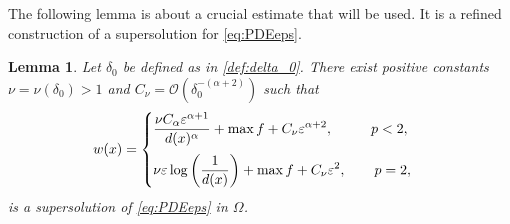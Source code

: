 \documentclass[12pt,reqno]{amsart}
\numberwithin{figure}{section}
\theoremstyle{plain}
\newtheorem{lem}[thm]{Lemma}
\theoremstyle{remark}
\numberwithin{equation}{section}
\begin{document}
\noindent The following lemma is about a crucial estimate that will be used. It is a refined construction of a supersolution for \eqref{eq:PDEeps}.
\begin{lem}\label{lem:super_refined} Let $\delta_0$ be defined as in \eqref{def:delta_0}. There exist positive constants $\nu = \nu(\delta_0)> 1$ and $C_\nu =\mathcal{O}\left(\delta_0^{-(\alpha+2)}\right)$ such that
\begin{equation}\label{e:superwa}
w(x) = \begin{cases}
    \displaystyle\frac{\nu C_\alpha \varepsilon^{\alpha+1}}{d(x)^\alpha} + \max f + C_\nu \varepsilon^{\alpha+2}, \qquad\;\;\,  p<2,\vspace{0.2cm}\\
    \displaystyle\nu \varepsilon \log\left(\frac{1}{d(x)}\right) + \max f+ C_\nu \varepsilon^2, \qquad  p=2,
\end{cases}
\end{equation}
is a supersolution of \eqref{eq:PDEeps} in $\Omega$. 
\end{lem}
\end{document}
